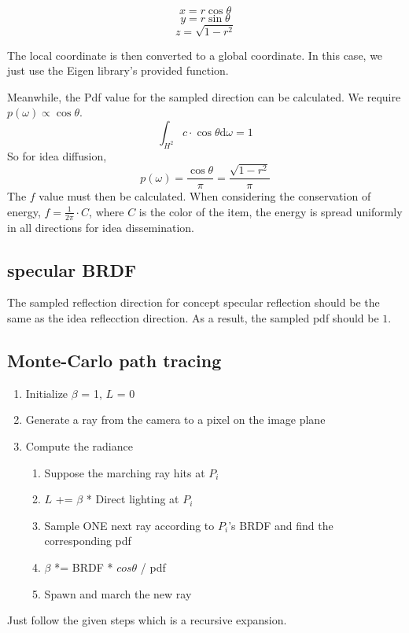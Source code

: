 \documentclass[acmtog]{acmart}
\begin{document}
	\[x = r \cos \theta\]
	\[y = r \sin \theta\]
	\[z = \sqrt{1 - r^2}\]

	The local coordinate is then converted to a global coordinate. In this case, we just use the Eigen library's provided function.

	Meanwhile, the Pdf value for the sampled direction can be calculated. We require $p(\omega) \propto \cos \theta$.
	\[
		\int_{H^2} c\cdot \cos \theta \mathrm{d}\omega = 1
	\]
	So for idea diffusion,
	\[
		p(\omega) = \frac{\cos \theta}{\pi} = \frac{\sqrt{1-r^2}}{\pi}
	\]
	The $f$ value must then be calculated. When considering the conservation of energy, $f = \frac{1}{2\pi} \cdot C$, where $C$ is the color of the item, the energy is spread uniformly in all directions for idea dissemination.

	\subsection{specular BRDF}
	The sampled reflection direction for concept specular reflection should be the same as the idea reflecction direction. As a result, the sampled pdf should be $1$.
	\subsection{Monte-Carlo path tracing}

	\begin{enumerate}
		\item Initialize $\beta$ = 1, $L$ = 0
		\item Generate a ray from the camera to a pixel on the image plane
		\item Compute the radiance
		\begin{enumerate}
			\item Suppose the marching ray hits at $P_i$
			\item  $L$ +=  $\beta$ * Direct lighting at $P_i$
			\item Sample ONE next ray according to $P_i$'s BRDF and find the corresponding pdf
			\item $\beta$ *=  BRDF * $cos\theta$ / pdf
			\item Spawn and march the new ray
		\end{enumerate}
	\end{enumerate}
	Just follow the given steps which is a recursive expansion.
\end{document}
